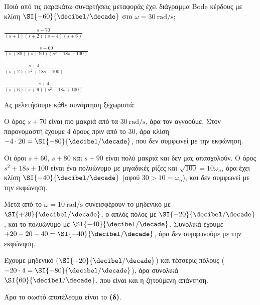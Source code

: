 \documentclass[11pt,a4paper,notitlepage,fleqn,final]{article}
\begin{document}
\begin{exercise}
Ποιά από τις παρακάτω συναρτήσεις μεταφοράς έχει διάγραμμα Bode κέρδους με κλίση
\( \SI{-60}{\decibel/\decade} \) στο \( \omega = \SI{30}{\radian/\second} \);

\begin{enumgreek}
	\item \( \displaystyle \frac{s+70}{(s+1)(s+2)(s+4)(s+6)} \)
	\item \( \displaystyle \frac{s+60}{(s+80)(s+90)(s^2+18s+100)} \)
	\item \( \displaystyle \frac{s+4}{(s+2)(s^2+18s+100)} \)
	\item \( \displaystyle \frac{s+4}{(s+6)(s+9)(s^2+18s+100)} \)
\end{enumgreek}

\tcblower
Ας μελετήσουμε κάθε συνάρτηση ξεχωριστά:
\begin{enumgreek}
	\item Ο όρος \( s+70 \) είναι πιο μακριά από τα \( \SI{30}{\radian/\second} \), άρα
	τον αγνοούμε. Στον παρονομαστή έχουμε 4 όρους πριν από το 30, άρα κλίση
	\( -4\cdot 20 = \SI{-80}{\decibel/\decade} \), που δεν συμφωνεί με την εκφώνηση.
	\item Οι όροι \( s+60 \), \( s+80 \) και \( s+90 \) είναι πολύ μακριά και δεν μας
	απασχολούν. Ο όρος \( s^2+18s+100 \) είναι ένα πολυώνυμο με μιγαδικές ρίζες και
	\( \sqrt{100} = 10\omega_n \), άρα έχει κλίση \( \SI{-40}{\decibel/\decade} \)
	(αφού \( 30 > 10 = \omega_n \)), και
	δεν συμφωνεί με την εκφώνηση.
	\item Μετά από το \( \omega = \SI{10}{\radian/\second} \) συνεισφέρουν το
	μηδενικό με \( \SI{+20}{\decibel/\decade} \), ο απλός πόλος με \( \SI{-20}{\decibel/\decade} \), και το πολυώνυμο με \( \SI{-40}{\decibel/\decade} \).
	Συνολικά έχουμε \( +20 -20 - 40 = \SI{-40}{\decibel/\decade} \), άρα δεν συμφωνούμε με την
	εκφώνηση.
	\item Έχουμε μηδενικό (\( \SI{+20}{\decibel/\decade} \)) και τέσσερις πόλους
	(\( -20\cdot 4 = \SI{-80}{\decibel/\decade} \)), άρα συνολικά \( \SI{60}{\decibel/\decade} \), που είναι και η ζητούμενη απάντηση.
\end{enumgreek}

Άρα το σωστό αποτέλεσμα είναι το \textbf{(δ)}.

\end{exercise}
\end{document}
